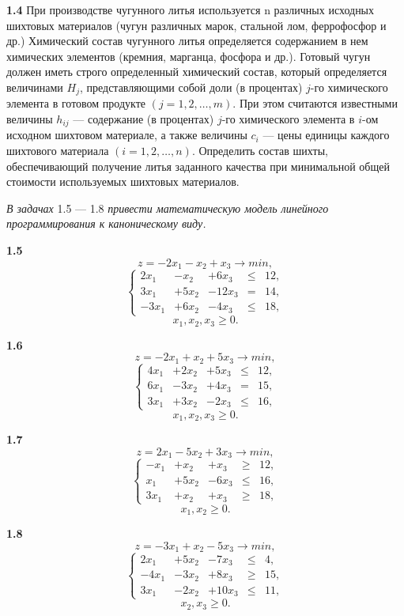 \documentclass[10pt, a5paper, twoside]{article} %
\begin{document}
\textbf{1.4} При производстве чугунного литья используется n различных исходных шихтовых материалов (чугун различных марок, стальной лом, феррофосфор и др.) Химический состав чугунного литья определяется содержанием в нем химических элементов (кремния, марганца, фосфора и др.). Готовый чугун должен иметь строго определенный химический состав, который определяется величинами $H_j$, представляющими собой доли (в процентах) $j$-го химического элемента в готовом продукте $(j=1,2,\ldots,m)$. При этом считаются известными величины $h_{ij}$ — содержание (в процентах) $j$-го химического элемента в $i$-ом исходном шихтовом материале, а также величины $c_i$ — цены единицы каждого шихтового материала $(i=1,2,\ldots,n)$. Определить состав шихты, обеспечивающий получение литья заданного качества при минимальной общей стоимости используемых шихтовых материалов.
\vspace{6pt}

\textit{В задачах} 1.5 — 1.8 \textit{привести математическую модель линейного программирования к каноническому виду.}

\begin{minipage}{0.4\textwidth}
 \textbf{1.5}
\[z=-2x_1 - x_2 + x_3 \rightarrow min,\]
$$
\left\{
\begin{array}{ccccc}
2x_1 &-x_2 &+6x_3 &\leq &12, \\
3x_1 &+5x_2 &-12x_3 &= &14, \\
-3x_1 &+6x_2 &-4x_3 &\leq &18,
\end{array}
\right.
$$
\[x_1, x_2, x_3\geq 0.\]
\end{minipage}
\hfill
\begin{minipage}{0.4\textwidth}
  \textbf{1.6}
  \[z=-2x_1 + x_2 + 5x_3 \rightarrow min,\]
$$
\left\{
\begin{array}{ccccc}
4x_1 &+2x_2 &+5x_3 &\leq &12, \\
6x_1 &-3x_2 &+4x_3 &= &15, \\
3x_1 &+3x_2 &-2x_3 &\leq &16,
\end{array}
\right.
$$
\[x_1, x_2, x_3\geq 0.\]
\end{minipage}

\begin{minipage}{0.4\textwidth}
 \textbf{1.7}
\[z=2x_1 - 5x_2 + 3x_3 \rightarrow min,\]
$$
\left\{
\begin{array}{ccccc}
-x_1 &+x_2 &+x_3 &\geq &12, \\
x_1 &+5x_2 &-6x_3 &\leq &16, \\
3x_1 &+x_2 &+x_3 &\geq &18,
\end{array}
\right.
$$
\[x_1, x_2\geq 0.\]
\end{minipage}
\hfill
\begin{minipage}{0.4\textwidth}
  \textbf{1.8}
  \[z=-3x_1 + x_2 - 5x_3 \rightarrow min,\]
$$
\left\{
\begin{array}{ccccc}
2x_1 &+5x_2 &-7x_3 &\leq &4, \\
-4x_1 &-3x_2 &+8x_3 &\geq &15, \\
3x_1 &-2x_2 &+10x_3 &\leq &11,
\end{array}
\right.
$$
\[x_2, x_3\geq 0.\]
\end{minipage}
\end{document}
